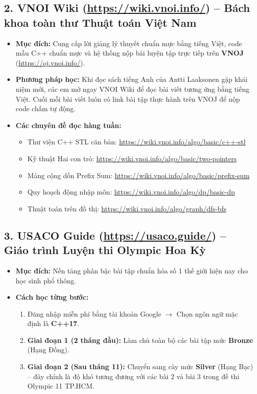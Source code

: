 \documentclass[11pt,a4paper]{article}
\begin{document}
\subsection*{\color{AsianBlue}\normalsize 2. VNOI Wiki (\url{https://wiki.vnoi.info/}) -- Bách khoa toàn thư Thuật toán Việt Nam}
\begin{itemize}
    \setlength{\itemsep}{2pt}
    \item \textbf{Mục đích:} Cung cấp lời giảng lý thuyết chuẩn mực bằng tiếng Việt, code mẫu C++ chuẩn mực và hệ thống nộp bài luyện tập trực tiếp trên \textbf{VNOJ} (\url{https://oj.vnoi.info/}).
    \item \textbf{Phương pháp học:} Khi đọc sách tiếng Anh của Antti Laaksonen gặp khái niệm mới, các em mở ngay VNOI Wiki để đọc bài viết tương ứng bằng tiếng Việt. Cuối mỗi bài viết luôn có link bài tập thực hành trên VNOJ để nộp code chấm tự động.
    \item \textbf{Các chuyên đề đọc hàng tuần:}
    \begin{itemize}
        \setlength{\itemsep}{1pt}
        \item Thư viện C++ STL căn bản: \url{https://wiki.vnoi.info/algo/basic/c++-stl}
        \item Kỹ thuật Hai con trỏ: \url{https://wiki.vnoi.info/algo/basic/two-pointers}
        \item Mảng cộng dồn Prefix Sum: \url{https://wiki.vnoi.info/algo/basic/prefix-sum}
        \item Quy hoạch động nhập môn: \url{https://wiki.vnoi.info/algo/dp/basic-dp}
        \item Thuật toán trên đồ thị: \url{https://wiki.vnoi.info/algo/graph/dfs-bfs}
    \end{itemize}
\end{itemize}

\subsection*{\color{AsianBlue}\normalsize 3. USACO Guide (\url{https://usaco.guide/}) -- Giáo trình Luyện thi Olympic Hoa Kỳ}
\begin{itemize}
    \setlength{\itemsep}{2pt}
    \item \textbf{Mục đích:} Nền tảng phân bậc bài tập chuẩn hóa số 1 thế giới hiện nay cho học sinh phổ thông.
    \item \textbf{Cách học từng bước:}
    \begin{enumerate}
        \setlength{\itemsep}{1pt}
        \item Đăng nhập miễn phí bằng tài khoản Google $\to$ Chọn ngôn ngữ mặc định là \textbf{C++17}.
        \item \textbf{Giai đoạn 1 (2 tháng đầu):} Làm chủ toàn bộ các bài tập mức \textbf{Bronze} (Hạng Đồng).
        \item \textbf{Giai đoạn 2 (Sau tháng 11):} Chuyển sang cày mức \textbf{Silver} (Hạng Bạc) -- đây chính là độ khó tương đương với các bài 2 và bài 3 trong đề thi Olympic 11 TP.HCM.
    \end{enumerate}
\end{itemize}
\end{document}
